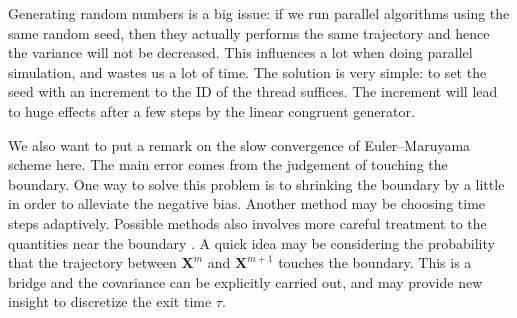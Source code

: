 \documentclass[english, nochinese]{pnote}
\begin{document}
Generating random numbers is a big issue: if we run parallel algorithms using the same random seed, then they actually performs the same trajectory and hence the variance will not be decreased. This influences a lot when doing parallel simulation, and wastes us a lot of time. The solution is very simple: to set the seed with an increment to the ID of the thread suffices. The increment will lead to huge effects after a few steps by the linear congruent generator.

We also want to put a remark on the slow convergence of Euler--Maruyama scheme here. The main error comes from the judgement of touching the boundary. One way to solve this problem is to shrinking the boundary by a little in order to alleviate the negative bias. Another method may be choosing time steps adaptively. Possible methods also involves more careful treatment to the quantities near the boundary \parencite{yan_parallel_2013}. A quick idea may be considering the probability that the trajectory between $ \bm{X}^m $ and $ \bm{X}^{ m + 1 } $ touches the boundary. This is a bridge and the covariance can be explicitly carried out, and may provide new insight to discretize the exit time $\tau$.

\printbibliography
\end{document}

